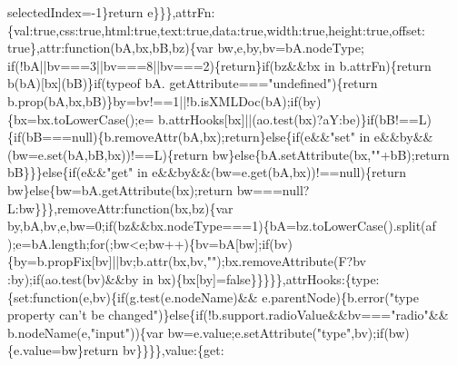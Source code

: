 \begin{DoxyCode}
      selectedIndex=-1\}\textcolor{keywordflow}{return} e\}\}\},attrFn:\{val:\textcolor{keyword}{true},css:\textcolor{keyword}{true},html:\textcolor{keyword}{true},text:\textcolor{keyword}{true},data:\textcolor{keyword}{true},width:\textcolor{keyword}{true},height:\textcolor{keyword}{true},offset:\textcolor{keyword}{
      true}\},attr:\textcolor{keyword}{function}(bA,bx,bB,bz)\{var bw,e,by,bv=bA.nodeType;
\textcolor{keywordflow}{if}(!bA||bv===3||bv===8||bv===2)\{\textcolor{keywordflow}{return}\}\textcolor{keywordflow}{if}(bz&&bx in b.attrFn)\{\textcolor{keywordflow}{return} b(bA)[bx](bB)\}\textcolor{keywordflow}{if}(typeof bA.
      getAttribute===\textcolor{stringliteral}{"undefined"})\{\textcolor{keywordflow}{return} b.prop(bA,bx,bB)\}by=bv!==1||!b.isXMLDoc(bA);\textcolor{keywordflow}{if}(by)\{bx=bx.toLowerCase();e=
      b.attrHooks[bx]||(ao.test(bx)?aY:be)\}\textcolor{keywordflow}{if}(bB!==L)\{\textcolor{keywordflow}{if}(bB===null)\{b.removeAttr(bA,bx);\textcolor{keywordflow}{return}\}\textcolor{keywordflow}{else}\{\textcolor{keywordflow}{if}(e&&\textcolor{stringliteral}{"set"} 
      in e&&by&&(bw=e.set(bA,bB,bx))!==L)\{\textcolor{keywordflow}{return} bw\}\textcolor{keywordflow}{else}\{bA.setAttribute(bx,\textcolor{stringliteral}{""}+bB);\textcolor{keywordflow}{return} bB\}\}\}\textcolor{keywordflow}{else}\{\textcolor{keywordflow}{if}(e&&\textcolor{stringliteral}{"get"} in 
      e&&by&&(bw=e.get(bA,bx))!==null)\{\textcolor{keywordflow}{return} bw\}\textcolor{keywordflow}{else}\{bw=bA.getAttribute(bx);\textcolor{keywordflow}{return} bw===null?
      L:bw\}\}\},removeAttr:\textcolor{keyword}{function}(bx,bz)\{var by,bA,bv,e,bw=0;\textcolor{keywordflow}{if}(bz&&bx.nodeType===1)\{bA=bz.toLowerCase().split(af
      );e=bA.length;\textcolor{keywordflow}{for}(;bw<e;bw++)\{bv=bA[bw];\textcolor{keywordflow}{if}(bv)\{by=b.propFix[bv]||bv;b.attr(bx,bv,\textcolor{stringliteral}{""});bx.removeAttribute(F?bv
      :by);\textcolor{keywordflow}{if}(ao.test(bv)&&by in bx)\{bx[by]=\textcolor{keyword}{false}\}\}\}\}\},attrHooks:\{type:\{set:\textcolor{keyword}{function}(e,bv)\{\textcolor{keywordflow}{if}(g.test(e.nodeName)&&
      e.parentNode)\{b.error(\textcolor{stringliteral}{"type property can't be changed"})\}\textcolor{keywordflow}{else}\{\textcolor{keywordflow}{if}(!b.support.radioValue&&bv===\textcolor{stringliteral}{"radio"}&&
      b.nodeName(e,\textcolor{stringliteral}{"input"}))\{var bw=e.value;e.setAttribute(\textcolor{stringliteral}{"type"},bv);\textcolor{keywordflow}{if}(bw)\{e.value=bw\}\textcolor{keywordflow}{return} bv\}\}\}\},value:\{\textcolor{keyword}{get}:\textcolor{keyword}{
}
\end{DoxyCode}
